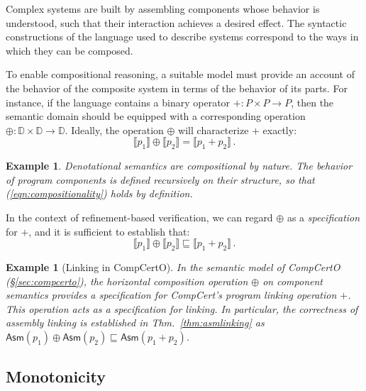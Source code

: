 \documentclass[draft,11pt]{report}
\newtheorem{example}[theorem]{Example}
\theoremstyle{definition}
\newcommand{\kw}[1]{\ensuremath{ \mathsf{#1} }}
\newcommand{\refby}{\sqsubseteq} %
\begin{document}
Complex systems are built by assembling components
whose behavior is understood,
such that their interaction achieves a desired effect.
The syntactic constructions of
the language used to describe systems
correspond to the ways in which they can be composed.

To enable compositional reasoning,
a suitable model must provide an account of
the behavior of the composite system
in terms of the behavior of its parts.
For instance,
if the language contains a binary operator
${+} : P \times P \rightarrow P$,
then the semantic domain should be equipped with
a corresponding operation
${\oplus} : \mathbb{D} \times \mathbb{D} \rightarrow \mathbb{D}$.
Ideally,
the operation $\oplus$
will characterize $+$ exactly:
\begin{equation}
  \llbracket p_1 \rrbracket \oplus \llbracket p_2 \rrbracket
  =
  \llbracket p_1 + p_2 \rrbracket
  \,.
  \label{eqn:compositionality}
\end{equation}

\begin{example}
Denotational semantics are compositional by nature.
The behavior of program components
is defined recursively on their structure,
so that (\ref{eqn:compositionality}) holds \emph{by definition}.
\end{example}

In the context of refinement-based verification,
we can regard $\oplus$ as a \emph{specification} for $+$,
and it is sufficient to establish that:
\begin{equation}
  \llbracket p_1 \rrbracket \oplus \llbracket p_2 \rrbracket
  \refby
  \llbracket p_1 + p_2 \rrbracket \,.
  \label{eqn:compositional-correctness}
\end{equation}

\begin{example}[Linking in CompCertO]
In the semantic model of CompCertO (\S\ref{sec:compcerto}),
the horizontal composition operation $\oplus$ on component semantics
provides a specification for
CompCert's program linking operation $+$.
This operation acts as a specification for linking.
In particular, the correctness of assembly linking
is established in Thm.~\ref{thm:asmlinking} as
$
  \kw{Asm}(p_1) \oplus \kw{Asm}(p_2) \refby
  \kw{Asm}(p_1 + p_2)
$.
\end{example}


\subsection{Monotonicity} %
\end{document}
